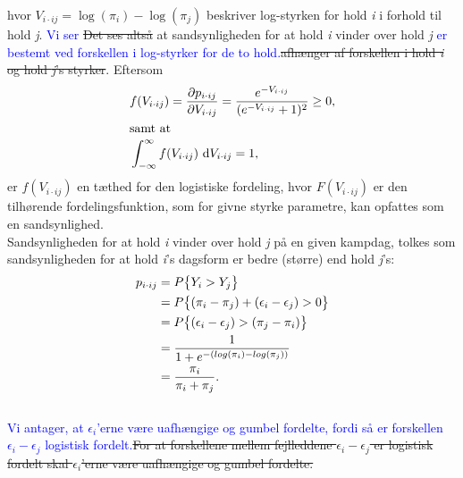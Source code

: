 \documentclass[11pt,a4paper]{article}
\begin{document}
hvor $V_{i\cdot ij}=\log(\pi_i)-\log(\pi_j)$ beskriver log-styrken for hold \textit{i} i forhold til hold \textit{j}. \textcolor{blue}{Vi ser} \sout{Det ses altså} at sandsynligheden for at hold \textit{i} vinder over hold \textit{j} \textcolor{blue}{er bestemt ved forskellen i log-styrker for de to hold.}\sout{afhænger af forskellen i hold \textit{i} og hold \textit{j}'s styrker}. Eftersom 
\begin{align*}
&f(V_{i\cdot ij})=\frac{\partial p_{i\cdot ij}}{\partial V_{i\cdot ij}} = \frac{e^{-V_{i\cdot ij}}}{(e^{-V_{i\cdot ij}}+1)^2} \geq 0, \\ 
\intertext{samt at}
&\int_{-\infty}^\infty f(V_{i\cdot ij}) \text{  d} V_{i\cdot ij} = 1,
\end{align*}
er $f(V_{i\cdot ij})$ en tæthed for den logistiske fordeling, hvor $F(V_{i\cdot ij})$ er den tilhørende fordelingsfunktion, som for givne styrke parametre, kan opfattes som en sandsynlighed.\\
Sandsynligheden for at hold \textit{i} vinder over hold \textit{j} på en given kampdag, tolkes som sandsynligheden for at hold \textit{i}'s dagsform er bedre (større) end hold \textit{j}'s:
\begin{align*}
p_{i\cdot ij}&=P\big{\{}Y_i>Y_j\big{\}}
\\&=P\big{\{}(\pi_i-\pi_j)+(\epsilon_i-\epsilon_j)>0\big{\}}
\\&=P\big{\{}(\epsilon_i-\epsilon_j)>(\pi_j-\pi_i)\big{\}}
\\&=\frac{1}{1+e^{-(log(\pi_i)-log(\pi_j))}} 
\\&=\frac{\pi_i}{\pi_i+\pi_j}.\;\;
\end{align*}
\\
\textcolor{blue}{Vi antager, at $\epsilon_i$'erne være uafhængige og gumbel fordelte, fordi så er forskellen $\epsilon_i-\epsilon_j$ logistisk fordelt.}\sout{For at forskellene mellem fejlleddene $\epsilon_i-\epsilon_j$ er logistisk fordelt skal $\epsilon_i$'erne være uafhængige og gumbel fordelte.}
\end{document}
